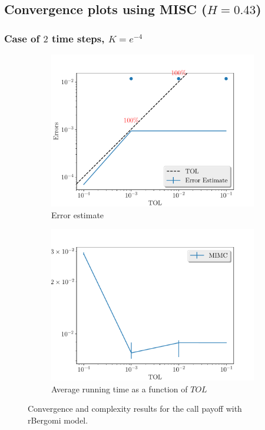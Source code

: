 \documentclass[11pt]{article}
\begin{document}
\newpage

\newpage
\subsection{Convergence plots using MISC ($H=0.43$)}\label{sec:Convergence plots using MISC_H_043}
\newpage
\subsubsection*{Case of $2$ time steps, $K=e^{-4}$}
\begin{figure}[!h]
	\centering
	\begin{subfigure}{.5\textwidth}
		\centering
		\includegraphics[width=1\linewidth]{./figures/rbergomi_2_steps_K_e__4/error_estimate.pdf}
		\caption{Error estimate}
		\label{fig:misc_rbergomi_2_steps_sub1}
	\end{subfigure}%
	\begin{subfigure}{.5\textwidth}
		\centering
		\includegraphics[width=1\linewidth]{./figures/rbergomi_2_steps_K_e__4/average_running_time.pdf}
		\caption{Average running time as a function of $TOL$}
		\label{fig:misc_rbergomi_2_steps_sub2}
	\end{subfigure}%
	\caption{Convergence and complexity results for the call payoff with rBergomi model.}
	\label{fig:misc_rbergomi_2_steps_1}
\end{figure}
\end{document}
